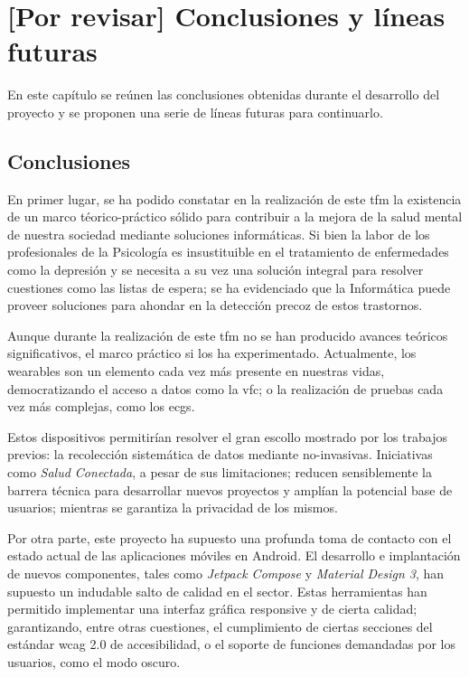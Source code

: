 \chapter{[Por revisar] Conclusiones y líneas futuras}
\label{chapter:conclusiones}


En este capítulo se reúnen las conclusiones obtenidas durante el desarrollo del proyecto y se proponen una serie de líneas futuras para continuarlo.

\section{Conclusiones}

    En primer lugar, se ha podido constatar en la realización de este \gls{tfm} la existencia de un marco téorico-práctico sólido para contribuir a la mejora de la salud mental de nuestra sociedad mediante soluciones informáticas. Si bien la labor de los profesionales de la Psicología es insustituible en el tratamiento de enfermedades como la depresión y se necesita a su vez una solución integral para resolver cuestiones como las listas de espera; se ha evidenciado que la Informática puede proveer soluciones para ahondar en la detección precoz de estos trastornos.

    Aunque durante la realización de este \gls{tfm} no se han producido avances teóricos significativos, el marco práctico si los ha experimentado. Actualmente, los \glspl{wearable} son un elemento cada vez más presente en nuestras vidas, democratizando el acceso a datos como la \gls{vfc}; o la realización de pruebas cada vez más complejas, como los \glspl{ecg}. 
    
    Estos dispositivos permitirían resolver el gran escollo mostrado por los trabajos previos: la recolección sistemática de datos mediante \glspl{no-invasiva}. Iniciativas como \textit{Salud Conectada}, a pesar de sus limitaciones; reducen sensiblemente la barrera técnica para desarrollar nuevos proyectos y amplían la potencial base de usuarios; mientras se garantiza la privacidad de los mismos.

    Por otra parte, este proyecto ha supuesto una profunda toma de contacto con el estado actual de las aplicaciones móviles en Android. El desarrollo e implantación de nuevos componentes, tales como \textit{Jetpack Compose} y \textit{Material Design 3}, han supuesto un indudable salto de calidad en el sector. Estas herramientas han permitido implementar una interfaz gráfica \gls{responsive} y de cierta calidad; garantizando, entre otras cuestiones, el cumplimiento de ciertas secciones del estándar \gls{wcag} 2.0 de accesibilidad, o el soporte de funciones demandadas por los usuarios, como el modo oscuro.
    
